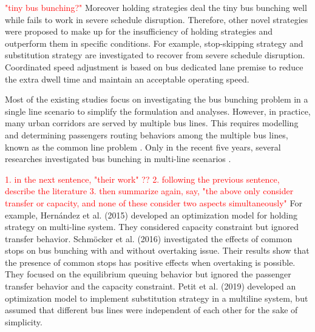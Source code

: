 \documentclass[smallextended]{svjour3}       %
\begin{document}
\begin{Abstract}
\textcolor{red}{"tiny bus bunching?"}
Moreover holding strategies deal the tiny bus bunching well while fails to work in severe schedule disruption.
Therefore, other novel strategies were proposed to make up for the insufficiency of holding strategies and outperform them in specific conditions. For example, stop-skipping strategy \citep{2003Fu,2005Sun} 
and substitution strategy \citep{2018Petit,2019Petit} are investigated to recover from severe schedule disruption. Coordinated speed adjustment \citep{2011Daganzo} is based on bus dedicated lane premise to reduce the extra dwell time and maintain an acceptable operating speed.

Most of the existing studies focus on investigating the bus bunching problem in a single line scenario to simplify the formulation and analyses. However, in practice, many urban corridors are served by multiple bus lines. This requires modelling and determining passengers routing behaviors among the multiple bus lines, known as the common line problem \citep{2015Argote-Cabanero}. 
Only in the recent five years, several researches investigated bus bunching in multi-line scenarios \citep{2015Carlos,2015Argote-Cabanero,2016Sun,2019Petit,2020Seman}. %

\textcolor{red}{
1. in the next sentence, "their work" ??
2. following the previous sentence, describe the literature 
3. then summarize again, say, "the above only consider transfer or capacity, and none of these consider two aspects simultaneously"
}
For example, Hernández et al. (2015) developed an optimization model for holding strategy on multi-line system.
They considered capacity constraint but ignored transfer behavior. Schmöcker et al. (2016) investigated the effects of common stops on bus bunching with and without overtaking issue. 
Their results show that the presence of common stops has positive effects when overtaking is possible.
They focused on the equilibrium queuing behavior but ignored the passenger transfer behavior and the capacity constraint. 
Petit et al. (2019) developed an optimization model to implement substitution strategy 
in a multiline system, but assumed that different bus lines were independent of each other for the sake of simplicity. 


\end{Abstract}
\end{document}
